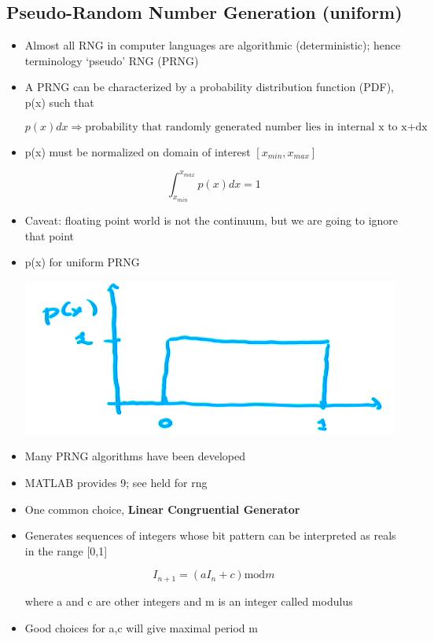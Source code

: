\subsection{Pseudo-Random Number Generation (uniform)}

\begin{itemize}
    \item Almost all RNG in computer languages are algorithmic (deterministic); hence terminology `pseudo' RNG (PRNG)

    \item A PRNG can be characterized by a probability distribution function (PDF), p(x) such that 

    \[ p(x) dx \Rightarrow \text{probability that randomly generated number lies in internal x to x+dx}\]

    \item p(x) must be normalized on domain of interest $[x_{min}, x_{max}]$

    \[ \int_{x_{min}}^{x_{max}} p(x) dx = 1\]

    \item Caveat: floating point world is not the continuum, but we are going to ignore that point

    \item p(x) for uniform PRNG

    \includegraphics[width = 0.4 \linewidth]{Images/pdf_uniform.png}

    \item Many PRNG algorithms have been developed 

    \item MATLAB provides 9; see held for rng

    \item One common choice, \textbf{Linear Congruential Generator}

    \item Generates sequences of integers whose bit pattern can be interpreted as reals in the range [0,1]

    \[I_{n+1} = (aI_n + c) \text{mod}m\]

    where a and c are other integers and m is an integer called modulus

    \item Good choices for a,c will give maximal period m
\end{itemize}

